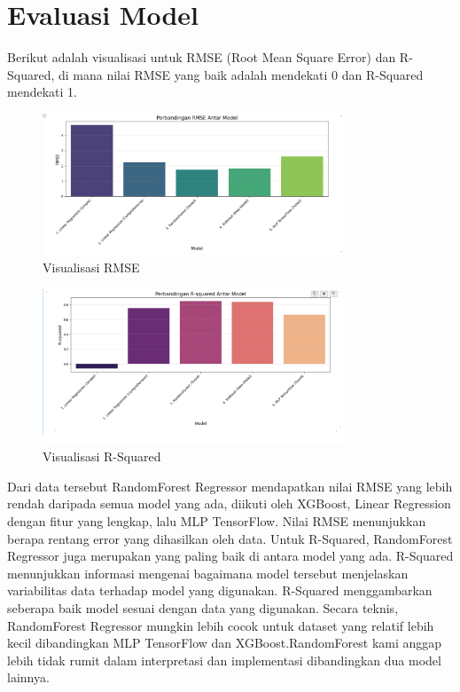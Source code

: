 \section{Evaluasi Model}

Berikut adalah visualisasi untuk RMSE (Root Mean Square Error) dan R-Squared, di mana nilai RMSE yang baik adalah mendekati 0 dan R-Squared 
mendekati 1.

\begin{figure}[h]
    \centering
    \includegraphics[width=0.8\textwidth]{images/rmse.png}
    \caption{Visualisasi RMSE}
    \label{fig:rmse}
\end{figure}

\begin{figure}[h]
    \centering
    \includegraphics[width=0.8\textwidth]{images/r-squared.png}
    \caption{Visualisasi R-Squared}
    \label{fig:rsquared}
\end{figure}

Dari data tersebut RandomForest Regressor mendapatkan nilai RMSE yang lebih rendah daripada semua model yang ada, diikuti oleh XGBoost, 
Linear Regression dengan fitur yang lengkap, lalu MLP TensorFlow. Nilai RMSE menunjukkan berapa rentang error yang dihasilkan oleh data. 
Untuk R-Squared, RandomForest Regressor juga merupakan yang paling baik di antara model yang ada. R-Squared menunjukkan informasi mengenai 
bagaimana model tersebut menjelaskan variabilitas data terhadap model yang digunakan. R-Squared menggambarkan seberapa baik model sesuai 
dengan data yang digunakan. Secara teknis, RandomForest Regressor mungkin lebih cocok untuk dataset yang relatif lebih kecil dibandingkan
MLP TensorFlow dan XGBoost.RandomForest kami anggap lebih tidak rumit dalam interpretasi dan implementasi dibandingkan dua model lainnya.\\

